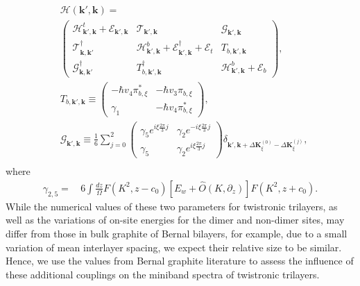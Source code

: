 \documentclass[showpacs,aps,prb,reprint,twocolumn]{revtex4-1}
\begin{document}
\begin{align}
&\mathcal{H}(\boldsymbol{k'},\boldsymbol{k})=
\\
&\left(
\begin{matrix}
\mathcal{H}_{\boldsymbol{k}',\boldsymbol{k}}^t+
\mathcal{E}_{\boldsymbol{k}',\boldsymbol{k}}&
\mathcal{T}_{\boldsymbol{k}',\boldsymbol{k}}&
\mathcal{G}_{\boldsymbol{k}',\boldsymbol{k}}\\
\mathcal{T}_{\boldsymbol{k},\boldsymbol{k}'}^\dagger&
\mathcal{H}_{\boldsymbol{k}',\boldsymbol{k}}^b+
\mathcal{E}_{\boldsymbol{k}',\boldsymbol{k}}^{\dagger}+
\mathcal{E}_t&
T_{b,\boldsymbol{k}',\boldsymbol{k}}\\
\mathcal{G}_{\boldsymbol{k},\boldsymbol{k}'}^\dagger&T_{b,\boldsymbol{k}',\boldsymbol{k}}^\dagger&
\mathcal{H}_{\boldsymbol{k}',\boldsymbol{k}}^b+
\mathcal{E}_b
\end{matrix}
\right),\nonumber\\
&T_{b,\boldsymbol{k}',\boldsymbol{k}}\equiv
\left(
\begin{matrix}
-\hbar v_4 \pi^*_{b,\xi} & -\hbar v_3 \pi_{b,\xi} \\
\gamma_1 & -\hbar v_4 \pi_{b,\xi}^*
\end{matrix}
\right),\nonumber\\
&\mathcal{G}_{\boldsymbol{k}',\boldsymbol{k}}\equiv
\frac{1}{6}
\sum_{j=0}^2
\left(
\begin{matrix}
\gamma_{5}
e^{i\xi\frac{2\pi}{3}j}&
\gamma_{2}
e^{-i\xi\frac{2\pi}{3}j}\\
\gamma_{5}&
\gamma_{2}e^{i\xi\frac{2\pi}{3}j}
\end{matrix}
\right)
\delta_{\boldsymbol{k}',\boldsymbol{k}+
\Delta\boldsymbol{K}_\xi^{(0)}-
\Delta\boldsymbol{K}_\xi^{(j)}},\nonumber\\
\end{align}
where
\begin{align}\label{eq:gamma_2and5}
\gamma_{2,5}=&\,6\!\!\int\frac{dz}{\Omega} F(K^2,z-c_0)
\left[E_w + \hat{O}(K,\partial_z)\right]
F(K^2,z+c_0).
\end{align}
While the numerical values of these two parameters for twistronic trilayers, as well as the variations of on-site energies for the dimer and non-dimer sites, may differ from those in bulk graphite of Bernal bilayers, for example, due to a small variation of mean interlayer spacing, we expect their relative size to be similar. Hence, we use the values from Bernal graphite literature to assess the influence of these additional couplings on the miniband spectra of twistronic trilayers. 
\end{document}
